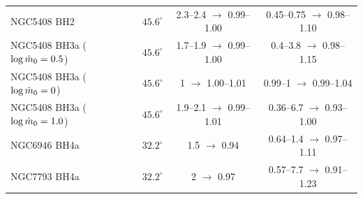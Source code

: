 \begin{table}
\begin{tabular}{@{}lccc@{}}
NGC5408 BH2 & $45.6^\circ$ & 2.3--2.4 $\to$ 0.99--1.00 & 0.45--0.75 $\to$ 0.98--1.10 \\
NGC5408 BH3a ($\log\dot m_0 = 0.5$) & $45.6^\circ$ & 1.7--1.9 $\to$ 0.99--1.00 & 0.4--3.8 $\to$ 0.98--1.15 \\
NGC5408 BH3a ($\log\dot m_0 = 0$) & $45.6^\circ$ & 1 $\to$ 1.00--1.01 & 0.99--1 $\to$ 0.99--1.04 \\
NGC5408 BH3a ($\log\dot m_0 = 1.0$) & $45.6^\circ$ & 1.9--2.1 $\to$ 0.99--1.01 & 0.36--6.7 $\to$ 0.93--1.00 \\
NGC6946 BH4a & $32.2^\circ$ & 1.5 $\to$ 0.94 & 0.64--1.4 $\to$ 0.97--1.11 \\
NGC7793 BH4a & $32.2^\circ$ & 2 $\to$ 0.97 & 0.57--7.7 $\to$ 0.91--1.23 \\
\bottomrule
\end{tabular}
\end{table}

